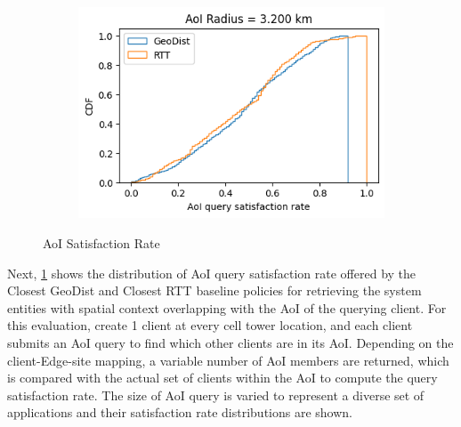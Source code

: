 \begin{figure}
\begin{subfigure}{0.333\textwidth}
  \caption{}
\end{subfigure}%
\begin{subfigure}{0.333\textwidth}
  \centering
  \includegraphics[width=\linewidth]{figures/mechanisms/spatial_ctx_mgmt/aoi_satisfaction_rate_cdf_AOI_3.200_km.png}
  \caption{}
\end{subfigure}
\caption{AoI Satisfaction Rate}
\label{fig:aoi_satisfaction_rate_eval}
\end{figure}

Next, \cref{fig:aoi_satisfaction_rate_eval} shows the distribution of AoI query satisfaction rate offered by the Closest GeoDist and Closest RTT baseline policies for retrieving the system entities with spatial context overlapping with the AoI of the querying client. For this evaluation, create 1 client at every cell tower location, and each client submits an AoI query to find which other clients are in its AoI. Depending on the client-Edge-site mapping, a variable number of AoI members are returned, which is compared with the actual set of clients within the AoI to compute the query satisfaction rate. The size of AoI query is varied to represent a diverse set of applications and their satisfaction rate distributions are shown.


